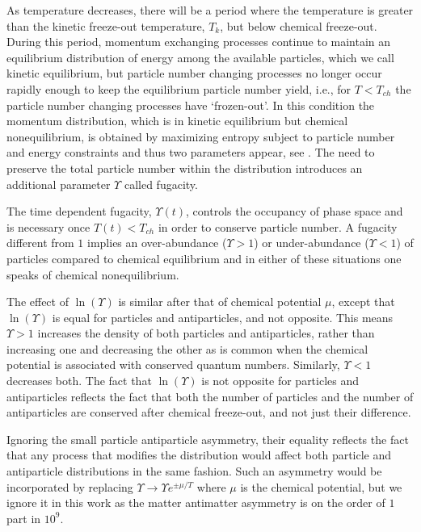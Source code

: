 As temperature decreases, there will be a period where the temperature is greater than the kinetic freeze-out temperature, $T_k$, but below chemical freeze-out. During this period, momentum exchanging processes continue to maintain an equilibrium distribution of energy among the available particles, which we call kinetic equilibrium, but particle number changing processes no longer occur rapidly enough to keep the equilibrium particle number yield, i.e., for $T<T_{ch}$ the particle number changing processes have `frozen-out'. In this condition the momentum distribution, which is in kinetic equilibrium but chemical nonequilibrium, is obtained by maximizing entropy subject to particle number and energy constraints and thus two parameters appear, see . The need to preserve the total particle number within the distribution introduces an additional parameter $\Upsilon$ called fugacity. 

The time dependent fugacity, $\Upsilon(t)$, controls the occupancy of phase space and is necessary once $T(t)<T_{ch}$ in order to conserve particle number. A fugacity different from $1$ implies an over-abundance ($\Upsilon>1$) or under-abundance ($\Upsilon<1$) of particles compared to chemical equilibrium and in either of these situations one speaks of chemical nonequilibrium. 

The effect of $\ln(\Upsilon)$ is similar after that of chemical potential $\mu$, except that $\ln(\Upsilon)$ is equal for particles and antiparticles, and not opposite. This means $\Upsilon>1$ increases the density of both particles and antiparticles, rather than increasing one and decreasing the other as is common when the chemical potential is associated with conserved quantum numbers. Similarly, $\Upsilon<1$ decreases both. The fact that $\ln(\Upsilon)$ is not opposite for particles and antiparticles reflects the fact that both the number of particles and the number of antiparticles are conserved after chemical freeze-out, and not just their difference. 

Ignoring the small particle antiparticle asymmetry, their equality reflects the fact that any process that modifies the distribution would affect both particle and antiparticle distributions in the same fashion. Such an asymmetry would be incorporated by replacing $\Upsilon\rightarrow \Upsilon e^{\pm\mu/T}$ where $\mu$ is the chemical potential, but we ignore it in this work as the matter antimatter asymmetry is on the order of $1$ part in $10^9$.

